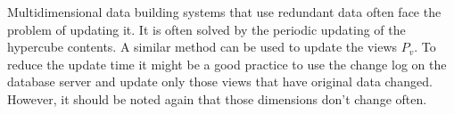 \documentclass[prodmode,acmtods]{acmsmall} %
\begin{document}
Multidimensional data building systems that use redundant data often face the
problem of updating it. It is often solved by the periodic updating of the
hypercube contents.
A similar method can be used to update the views $P_v$. To reduce the update
time it might be a good practice to use the change log on the database server
and update only those views that have original data changed. However, it should
be noted again that those dimensions don't change often.





\elecappendix

\medskip
\end{document}
